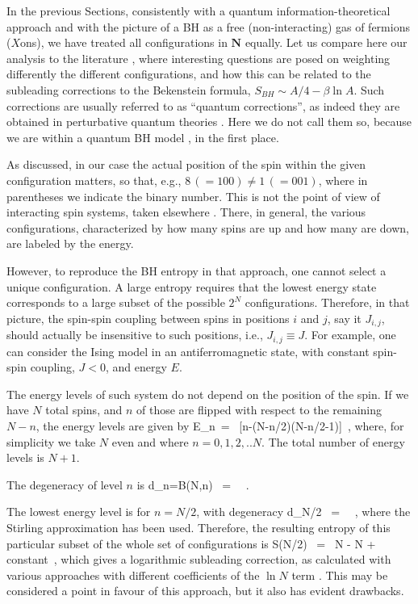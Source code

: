 \documentclass[aps,prd,showkeys,nofootinbib,superscriptaddress]{revtex4-2}
\begin{document}
In the previous Sections, consistently with a quantum information-theoretical approach and with the picture of a BH as a free (non-interacting) gas of fermions ($X$ons), we have treated all configurations in $\mathbf{N}$ equally. Let us compare here our analysis to the literature \cite{kiefer}, where interesting questions are posed on weighting differently the different configurations, and how this can be related to the subleading corrections to the Bekenstein formula, $S_ {BH} \sim A/4 - \beta \ln A$. Such corrections are usually referred to as ``quantum corrections'', as indeed they are obtained in perturbative quantum theories \cite{Kaul:2000kf, Gupta:2001bg, Ghosh:2004rq, Majhi:2013tw, Singleton:2013ama, Ong:2018xna}. Here we do not call them so, because we are within a quantum BH model \cite{mukhanov,bekenstein2,bekenstein3}, in the first place.

As discussed, in our case the actual position of the spin within the given configuration matters, so that, e.g., $8 \, (= 100) \neq 1 \, (= 001)$, where in parentheses we indicate the binary number. This is not the point of view of interacting spin systems, taken elsewhere \cite{kiefer}. There, in general, the various configurations, characterized by how many spins are up and how many are down, are labeled by the energy.

However, to reproduce the BH entropy in that approach, one cannot select a unique configuration. A large entropy requires that the lowest energy state corresponds to a large subset of the possible $2^N$ configurations. Therefore, in that picture, the spin-spin coupling between spins in positions $i$  and $j$, say it $J_{i,j}$, should actually be insensitive to such positions, i.e., $J_{i,j} \equiv J$.  For example, one can consider the Ising model in an antiferromagnetic state, with constant spin-spin coupling, $J<0$, and energy $E$.

The energy levels of such system do not depend on the position of the spin. If we have $N$ total spins, and $n$ of those are flipped with respect to the remaining $N-n$, the energy levels are given by  \cite{Czachor1}
\be \label{eq17}
E_n\ = \ [n-(N-n/2)(N-n/2-1)] \,,
\ee
where, for simplicity we take $N$ even and where $n=0,1,2,..N$. The total number of energy levels is $N+1$.

The degeneracy of level $n$ is
\be
d_n=B(N,n) \ = \   \,.
\ee

The lowest energy level is for $n=N/2$, with degeneracy
\be
d_{N/2} \ = \ \simeq {}  \,,
\ee
where the Stirling approximation has been used. Therefore, the resulting entropy of this particular subset of the whole set of configurations is
\be
S(N/2) \ = \ N  -  \ln N + constant \,,
\ee
which gives a logarithmic subleading correction, as calculated with various approaches with different coefficients of the $\ln N$ term \cite{Kaul:2000kf, Gupta:2001bg, Ghosh:2004rq, Majhi:2013tw, Singleton:2013ama, Ong:2018xna}. This may be considered a point in favour of this approach, but it also has evident drawbacks.
\end{document}
